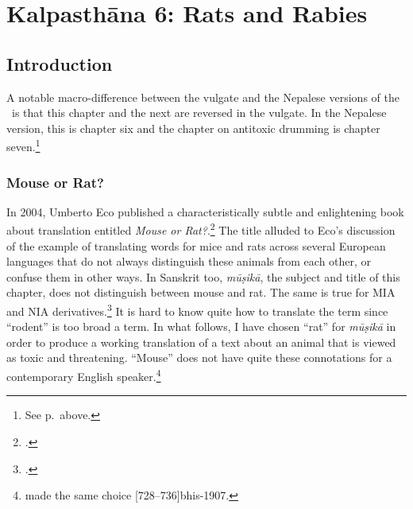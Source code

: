 \chapter{Kalpasthāna 6: Rats and Rabies}
\label{mūṣikā}


\section{Introduction}

A notable macro-difference between the vulgate and the Nepalese
versions of the \SS\ is that this chapter and the next are reversed
in the vulgate.  In the Nepalese version, this is chapter six and the
chapter on antitoxic drumming is chapter seven.\footnote{See
    p.\,\pageref{kalpa-chapter-sequence} above.}

\subsection{Mouse or Rat?}

In 2004, Umberto Eco published a characteristically subtle and
enlightening book about translation entitled \emph{Mouse or
    Rat?}.\footcite{eco-2004} The title alluded to Eco's discussion of the
example of translating words for mice and rats across several
European languages that do not always distinguish these animals from
each other, or confuse them in other ways.  In Sanskrit too,
\emph{mūṣikā}, the subject and title of this chapter, does not
distinguish between mouse and rat.  The same is true for MIA and NIA
derivatives.\footcite[\#10258]{CDIAL}  It is hard to know quite how
to translate the term since “rodent” is too broad a term.  In what
follows, I have chosen “rat” for \emph{mūṣikā} in order to produce a
working translation of a text about an animal that is viewed as toxic
and threatening.  ``Mouse'' does not have quite these connotations
for a contemporary English speaker.\footnote{\citeauthor{bhis-1907}
    made the same choice [728--736]{bhis-1907}.}

